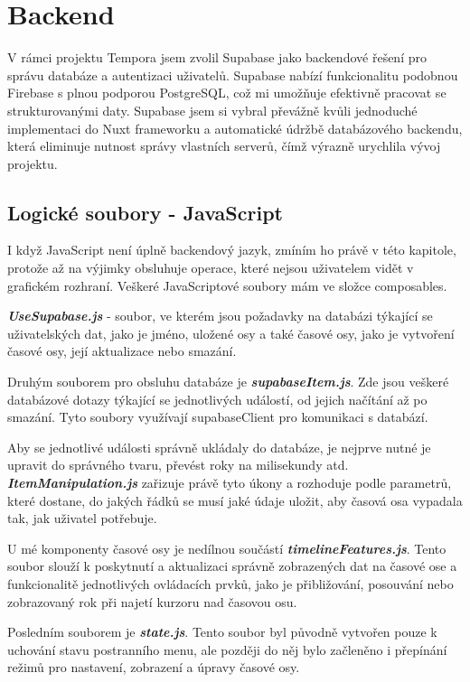 \section{Backend}
\label{Backend}
V rámci projektu Tempora jsem zvolil Supabase jako backendové řešení pro správu databáze a autentizaci uživatelů. Supabase nabízí funkcionalitu podobnou Firebase s plnou podporou PostgreSQL, což mi umožňuje efektivně pracovat se strukturovanými daty. Supabase jsem si vybral převážně kvůli jednoduché implementaci do Nuxt frameworku a automatické údržbě databázového backendu, která eliminuje nutnost správy vlastních serverů, čímž výrazně urychlila vývoj projektu.

\subsection{Logické soubory - JavaScript}
I když JavaScript není úplně backendový jazyk, zmíním ho právě v této kapitole, protože až na výjimky obsluhuje operace, které nejsou uživatelem vidět v grafickém rozhraní. Veškeré JavaScriptové soubory mám ve složce composables. 

\textbf{\textit{UseSupabase.js}} - soubor, ve kterém jsou požadavky na databázi týkající se uživatelských dat, jako je jméno, uložené osy a také časové osy, jako je vytvoření časové osy, její aktualizace nebo smazání.

Druhým souborem pro obsluhu databáze je \textit{\textbf{supabaseItem.js}}. Zde jsou veškeré databázové dotazy týkající se jednotlivých událostí, od jejich načítání až po smazání. Tyto soubory využívají supabaseClient pro komunikaci s databází.

Aby se jednotlivé události správně ukládaly do databáze, je nejprve nutné je upravit do správného tvaru, převést roky na milisekundy atd. \textbf{\textit{ItemManipulation.js}} zařizuje právě tyto úkony a rozhoduje podle parametrů, které dostane, do jakých řádků se musí jaké údaje uložit, aby časová osa vypadala tak, jak uživatel potřebuje.

U mé komponenty časové osy je nedílnou součástí \textbf{\textit{timelineFeatures.js}}. Tento soubor slouží k poskytnutí a aktualizaci správně zobrazených dat na časové ose a funkcionalitě jednotlivých ovládacích prvků, jako je přibližování, posouvání nebo zobrazovaný rok při najetí kurzoru nad časovou osu.

Posledním souborem je \textbf{\textit{state.js}}. Tento soubor byl původně vytvořen pouze k uchování stavu postranního menu, ale později do něj bylo začleněno i přepínání režimů pro nastavení, zobrazení a úpravy časové osy.

